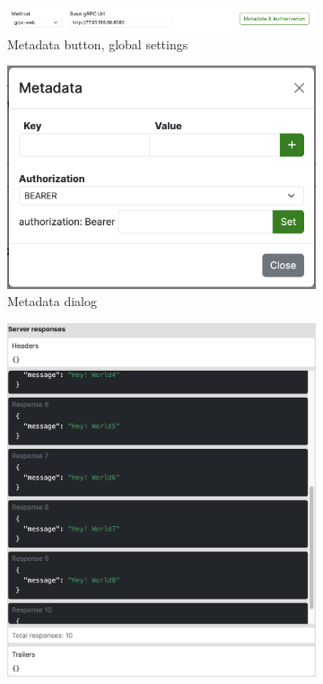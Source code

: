 \begin{figure}[!htb]
    \begin{subfigure}{.85\textwidth}
        \centering
        \includegraphics[width=.95\linewidth]{images/testing/screenshots/testing-top-bar}
        \caption{Metadata button, global settings}
        \label{fig:testing-changes-top-bar}
    \end{subfigure}%

    \vspace{15mm}%

    \begin{subfigure}{.45\textwidth}
        \centering
        \includegraphics[width=.95\linewidth]{images/testing/screenshots/testing-metadata}
        \caption{Metadata dialog}
        \label{fig:testing-changes-metadata}
    \end{subfigure}%
    \begin{subfigure}{.55\textwidth}
        \centering
        \includegraphics[width=.95\linewidth]{images/testing/screenshots/testing-responses}

\end{subfigure}
\end{figure}
